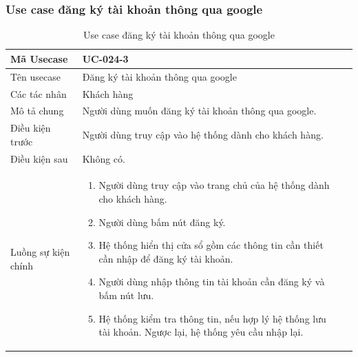 \documentclass[12pt,a4paper]{article}
\begin{document}
    \subsubsection*{Use case đăng ký tài khoản thông qua google}
    \begin{table}[H]
        \centering
        \begin{tabular}{|p{3.5cm}|p{11.5cm}|c|}
            \hline
            Mã Usecase      & UC-024-3                                              \\
            \hline
            Tên usecase     & Đăng ký tài khoản thông qua google                    \\
            \hline
            Các tác nhân    & Khách hàng                                            \\
            \hline
            Mô tả chung     & Người dùng muốn đăng ký tài khoản thông qua google.   \\
            \hline

            Điều kiện trước & Người dùng truy cập vào hệ thống dành cho khách hàng. \\
            \hline

            Điều kiện sau   & Không có.                                             \\
            \hline

            Luồng sự kiện chính & \vspace{-.8cm}\begin{enumerate}
                                                    \item Người dùng truy cập vào trang chủ của hệ thống dành cho khách hàng.
                                                    \item Người dùng bấm nút đăng ký.
                                                    \item Hệ thống hiển thị cửa sổ gồm các thông tin cần thiết cần nhập để đăng ký tài khoản.
                                                    \item Người dùng nhập thông tin tài khoản cần đăng ký và bấm nút lưu.
                                                    \item Hệ thống kiểm tra thông tin, nếu hợp lý hệ thống lưu tài khoản. Ngược lại, hệ thống yêu cầu nhập lại.
            \end{enumerate}
            \\
            \hline
        \end{tabular}
        \caption{Use case đăng ký tài khoản thông qua google}

    \end{table}
\end{document}
